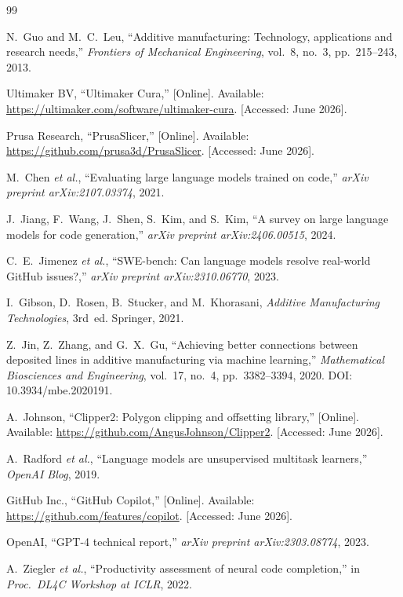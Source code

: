 \documentclass[10pt,twocolumn,a4paper]{article}
\begin{document}
\begin{thebibliography}{99}

N.~Guo and M.~C.~Leu,
``Additive manufacturing: Technology, applications and research needs,''
\textit{Frontiers of Mechanical Engineering},
vol.~8, no.~3, pp.~215--243, 2013.

Ultimaker BV,
``Ultimaker Cura,''
[Online]. Available: \url{https://ultimaker.com/software/ultimaker-cura}.
[Accessed: June 2026].

Prusa Research,
``PrusaSlicer,''
[Online]. Available: \url{https://github.com/prusa3d/PrusaSlicer}.
[Accessed: June 2026].

M.~Chen \textit{et al.},
``Evaluating large language models trained on code,''
\textit{arXiv preprint arXiv:2107.03374}, 2021.

J.~Jiang, F.~Wang, J.~Shen, S.~Kim, and S.~Kim,
``A survey on large language models for code generation,''
\textit{arXiv preprint arXiv:2406.00515}, 2024.

C.~E.~Jimenez \textit{et al.},
``SWE-bench: Can language models resolve real-world GitHub issues?,''
\textit{arXiv preprint arXiv:2310.06770}, 2023.

I.~Gibson, D.~Rosen, B.~Stucker, and M.~Khorasani,
\textit{Additive Manufacturing Technologies}, 3rd~ed.
Springer, 2021.

Z.~Jin, Z.~Zhang, and G.~X.~Gu,
``Achieving better connections between deposited lines in
additive manufacturing via machine learning,''
\textit{Mathematical Biosciences and Engineering},
vol.~17, no.~4, pp.~3382--3394, 2020.
DOI: 10.3934/mbe.2020191.

A.~Johnson,
``Clipper2: Polygon clipping and offsetting library,''
[Online]. Available: \url{https://github.com/AngusJohnson/Clipper2}.
[Accessed: June 2026].

A.~Radford \textit{et al.},
``Language models are unsupervised multitask learners,''
\textit{OpenAI Blog}, 2019.

GitHub Inc.,
``GitHub Copilot,''
[Online]. Available: \url{https://github.com/features/copilot}.
[Accessed: June 2026].

OpenAI,
``GPT-4 technical report,''
\textit{arXiv preprint arXiv:2303.08774}, 2023.

A.~Ziegler \textit{et al.},
``Productivity assessment of neural code completion,''
in \textit{Proc.\ DL4C Workshop at ICLR}, 2022.

\end{thebibliography}
\end{document}
